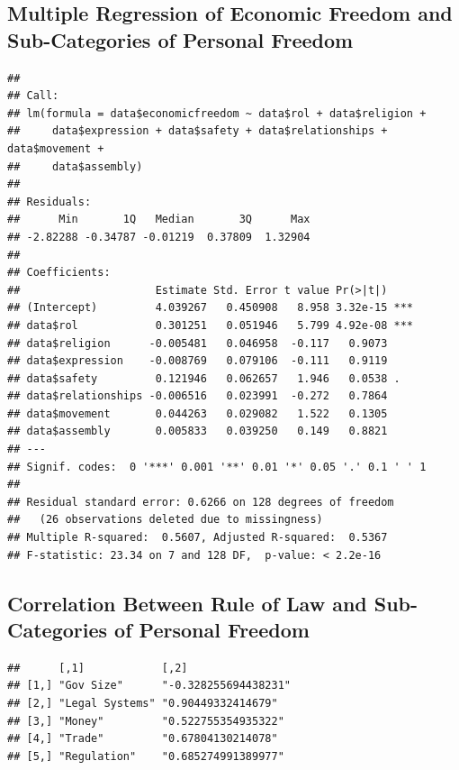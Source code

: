 \documentclass[]{article}
\begin{document}
\hypertarget{multiple-regression-of-economic-freedom-and-sub-categories-of-personal-freedom}{%
\subsection{Multiple Regression of Economic Freedom and Sub-Categories
of Personal
Freedom}\label{multiple-regression-of-economic-freedom-and-sub-categories-of-personal-freedom}}

\begin{verbatim}
## 
## Call:
## lm(formula = data$economicfreedom ~ data$rol + data$religion + 
##     data$expression + data$safety + data$relationships + data$movement + 
##     data$assembly)
## 
## Residuals:
##      Min       1Q   Median       3Q      Max 
## -2.82288 -0.34787 -0.01219  0.37809  1.32904 
## 
## Coefficients:
##                     Estimate Std. Error t value Pr(>|t|)    
## (Intercept)         4.039267   0.450908   8.958 3.32e-15 ***
## data$rol            0.301251   0.051946   5.799 4.92e-08 ***
## data$religion      -0.005481   0.046958  -0.117   0.9073    
## data$expression    -0.008769   0.079106  -0.111   0.9119    
## data$safety         0.121946   0.062657   1.946   0.0538 .  
## data$relationships -0.006516   0.023991  -0.272   0.7864    
## data$movement       0.044263   0.029082   1.522   0.1305    
## data$assembly       0.005833   0.039250   0.149   0.8821    
## ---
## Signif. codes:  0 '***' 0.001 '**' 0.01 '*' 0.05 '.' 0.1 ' ' 1
## 
## Residual standard error: 0.6266 on 128 degrees of freedom
##   (26 observations deleted due to missingness)
## Multiple R-squared:  0.5607, Adjusted R-squared:  0.5367 
## F-statistic: 23.34 on 7 and 128 DF,  p-value: < 2.2e-16
\end{verbatim}

\hypertarget{correlation-between-rule-of-law-and-sub-categories-of-personal-freedom}{%
\subsection{Correlation Between Rule of Law and Sub-Categories of
Personal
Freedom}\label{correlation-between-rule-of-law-and-sub-categories-of-personal-freedom}}

\begin{verbatim}
##      [,1]            [,2]                
## [1,] "Gov Size"      "-0.328255694438231"
## [2,] "Legal Systems" "0.90449332414679"  
## [3,] "Money"         "0.522755354935322" 
## [4,] "Trade"         "0.67804130214078"  
## [5,] "Regulation"    "0.685274991389977"
\end{verbatim}
\end{document}
